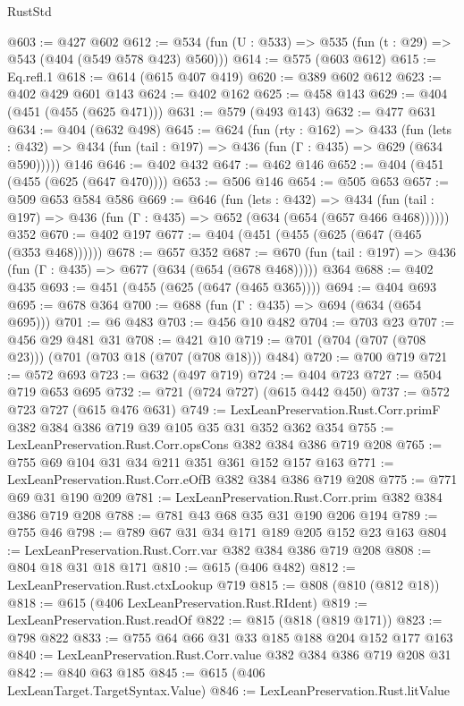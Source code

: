\begin{lexlean}{RustStd}
\begin{coremodule}
{\begin{coremodule}
{{{{{@603 := @427 @602
@612 := @534 (fun (U : @533) => @535 (fun (t : @29) => @543 (@404 (@549 @578 @423) @560)))
@614 := @575 (@603 @612)
@615 := Eq.refl.{1}
@618 := @614 (@615 @407 @419)
@620 := @389 @602 @612
@623 := @402 @429 @601 @143
@624 := @402 @162
@625 := @458 @143
@629 := @404 (@451 (@455 (@625 @471)))
@631 := @579 (@493 @143)
@632 := @477 @631
@634 := @404 (@632 @498)
@645 := @624
    (fun (rty : @162) =>
    @433
      (fun (lets : @432) => @434 (fun (tail : @197) => @436 (fun (Γ : @435) => @629 (@634 @590)))))
    @146
@646 := @402 @432
@647 := @462 @146
@652 := @404 (@451 (@455 (@625 (@647 @470))))
@653 := @506 @146
@654 := @505 @653
@657 := @509 @653 @584 @586
@669 := @646
    (fun (lets : @432) =>
    @434 (fun (tail : @197) => @436 (fun (Γ : @435) => @652 (@634 (@654 (@657 @466 @468))))))
    @352
@670 := @402 @197
@677 := @404 (@451 (@455 (@625 (@647 (@465 (@353 @468))))))
@678 := @657 @352
@687 := @670 (fun (tail : @197) => @436 (fun (Γ : @435) => @677 (@634 (@654 (@678 @468))))) @364
@688 := @402 @435
@693 := @451 (@455 (@625 (@647 (@465 @365))))
@694 := @404 @693
@695 := @678 @364
@700 := @688 (fun (Γ : @435) => @694 (@634 (@654 @695)))
@701 := @6 @483
@703 := @456 @10 @482
@704 := @703 @23
@707 := @456 @29 @481 @31
@708 := @421 @10
@719 := @701 (@704 (@707 (@708 @23))) (@701 (@703 @18 (@707 (@708 @18))) @484)
@720 := @700 @719
@721 := @572 @693
@723 := @632 (@497 @719)
@724 := @404 @723
@727 := @504 @719 @653 @695
@732 := @721 (@724 @727) (@615 @442 @450)
@737 := @572 @723 @727 (@615 @476 @631)
@749 := LexLeanPreservation.Rust.Corr.primF @382 @384 @386 @719 @39 @105 @35 @31 @352 @362 @354
@755 := LexLeanPreservation.Rust.Corr.opsCons @382 @384 @386 @719 @208
@765 := @755 @69 @104 @31 @34 @211 @351 @361 @152 @157 @163
@771 := LexLeanPreservation.Rust.Corr.eOfB @382 @384 @386 @719 @208
@775 := @771 @69 @31 @190 @209
@781 := LexLeanPreservation.Rust.Corr.prim @382 @384 @386 @719 @208
@788 := @781 @43 @68 @35 @31 @190 @206 @194
@789 := @755 @46
@798 := @789 @67 @31 @34 @171 @189 @205 @152 @23 @163
@804 := LexLeanPreservation.Rust.Corr.var @382 @384 @386 @719 @208
@808 := @804 @18 @31 @18 @171
@810 := @615 (@406 @482)
@812 := LexLeanPreservation.Rust.ctxLookup @719
@815 := @808 (@810 (@812 @18))
@818 := @615 (@406 LexLeanPreservation.Rust.RIdent)
@819 := LexLeanPreservation.Rust.readOf
@822 := @815 (@818 (@819 @171))
@823 := @798 @822
@833 := @755 @64 @66 @31 @33 @185 @188 @204 @152 @177 @163
@840 := LexLeanPreservation.Rust.Corr.value @382 @384 @386 @719 @208 @31
@842 := @840 @63 @185
@845 := @615 (@406 LexLeanTarget.TargetSyntax.Value)
@846 := LexLeanPreservation.Rust.litValue
}}}}}
\end{coremodule}}
\end{coremodule}
\end{lexlean}
